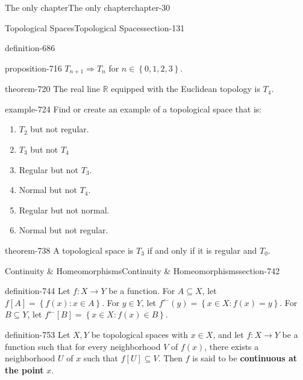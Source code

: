 \documentclass[oneside,10pt,]{book}
\newcommand{\terminology}[1]{\textbf{#1}}
\newcommand{\mb}{\mathbb}
\newcommand{\setBuilder}[2]{\left\{#1:#2\right\}}
\newcommand{\setList}[1]{\left\{#1\right\}}
\begin{document}
\begin{chapterptx}{The only chapter}{}{The only chapter}{}{}{chapter-30}
\begin{sectionptx}{Topological Spaces}{}{Topological Spaces}{}{}{section-131}
\begin{definition}{}{definition-686}
\begin{enumerate}
\end{enumerate}
\end{definition}
\begin{proposition}{}{}{proposition-716}%
\hypertarget{p-717}{}%
\(T_{n+1}\Rightarrow T_n\) for \(n\in\setList{0,1,2,3}\).%
\end{proposition}
\begin{theorem}{}{}{theorem-720}%
\hypertarget{p-721}{}%
The real line \(\mb R\) equipped with the Euclidean topology is \(T_4\).%
\end{theorem}
\begin{example}{}{example-724}%
\hypertarget{p-725}{}%
Find or create an example of a topological space that is:%
\leavevmode%
\begin{enumerate}
\item\hypertarget{li-727}{}\(T_2\) but not regular.%
\item\hypertarget{li-729}{}\(T_3\) but not \(T_4\)%
\item\hypertarget{li-732}{}Regular but not \(T_3\).%
\item\hypertarget{li-734}{}Normal but not \(T_4\).%
\item\hypertarget{li-736}{}Regular but not normal.%
\item\hypertarget{li-737}{}Normal but not regular.%
\end{enumerate}
\end{example}
\begin{theorem}{}{}{theorem-738}%
\hypertarget{p-739}{}%
A topological space is \(T_3\) if and only if it is regular and \(T_0\).%
\end{theorem}
\end{sectionptx}
%
%
\typeout{************************************************}
\typeout{************************************************}
%
\begin{sectionptx}{Continuity \& Homeomorphisms}{}{Continuity \& Homeomorphisms}{}{}{section-742}
\begin{definition}{}{definition-744}%
\hypertarget{p-745}{}%
Let \(f:X\to Y\) be a function. For \(A\subseteq X\), let \(f[A]=\setBuilder{f(x)}{x\in A}\). For \(y\in Y\), let \(f^\leftarrow(y)=\setBuilder{x\in X}{f(x)=y}\). For \(B\subseteq Y\), let \(f^\leftarrow[B]=\setBuilder{x\in X}{f(x)\in B}\).%
\end{definition}
\begin{definition}{}{definition-753}%
\hypertarget{p-754}{}%
Let \(X,Y\) be topological spaces with \(x\in X\), and let \(f:X\to Y\) be a function such that for every neighborhood \(V\) of \(f(x)\), there exists a neighborhood \(U\) of \(x\) such that \(f[U]\subseteq V\). Then \(f\) is said to be \terminology{continuous at the point} \(x\).%

\end{definition}
\end{sectionptx}
\end{chapterptx}
\end{document}
